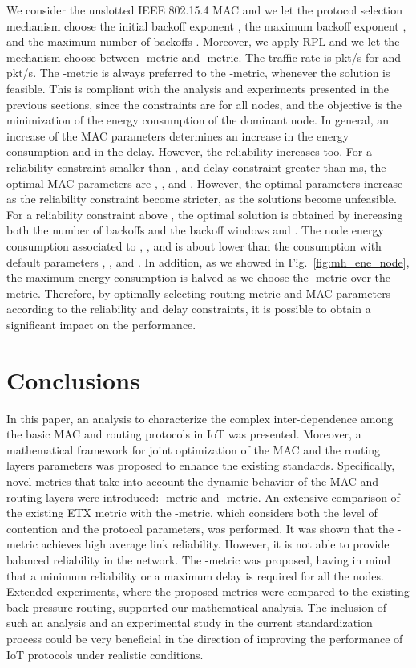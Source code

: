 \documentclass[review, 1p, 11pt]{elsarticle}
\numberwithin{equation}{section}
\begin{document}
We consider the unslotted IEEE
802.15.4 MAC and we let the protocol selection mechanism choose the
initial backoff exponent , the maximum backoff exponent
, and the maximum number of backoffs .
Moreover, we apply RPL and we let the mechanism choose between -metric and -metric.
The traffic rate is  pkt/s for  and  pkt/s.
The -metric is always preferred to the -metric, whenever the solution is feasible.
This is compliant with the analysis and experiments presented in the previous sections,
since the constraints are for all nodes, and the objective is the minimization of the energy consumption
of the dominant node.
In general, an increase of the MAC parameters determines an increase in the energy consumption and in the delay.
However, the reliability increases too.
For a reliability constraint smaller than , and delay constraint greater than  ms,
the optimal MAC parameters are , , and
.  However, the optimal parameters increase as the reliability constraint become stricter,  as the solutions become unfeasible.
For a reliability constraint above ,  the optimal solution is obtained by increasing both the number of backoffs  and the backoff windows  and .
The node energy consumption associated to , , and
 is about  lower than the consumption with default parameters , , and . In addition, as we showed in Fig.~\ref{fig:mh_ene_node}, the maximum energy consumption is halved as we choose the -metric over the -metric.
Therefore, by optimally selecting routing metric and MAC parameters according to the reliability and delay constraints, it is possible to obtain a significant impact on the performance.












\section{Conclusions} \label{sec:conclusions}
In this paper, an analysis to characterize the complex inter-dependence among the basic MAC and routing protocols in IoT was presented. Moreover, a mathematical framework for joint
optimization of the MAC and the routing layers parameters was proposed to enhance the existing standards.
Specifically, novel metrics that take into account the
dynamic behavior of the MAC and routing layers were introduced: -metric and -metric. An extensive comparison of the existing ETX metric with the -metric, which considers both the level of contention and the protocol parameters, was performed.
It was shown that the -metric achieves high average link reliability. However, it is not able to provide balanced reliability in the network.
The -metric was proposed, having in mind that a minimum reliability or a maximum delay is required for all the nodes. Extended experiments, where the proposed metrics were compared to the existing back-pressure routing, supported our mathematical analysis.
The inclusion of such an analysis and an experimental study in the current
standardization process could be very beneficial in the direction of improving the
performance of IoT protocols under realistic conditions.
\end{document}
